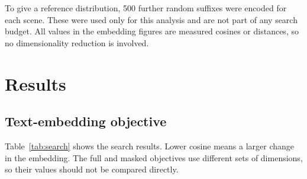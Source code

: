 \documentclass[11pt]{article}
\begin{document}
To give a reference distribution, 500 further random suffixes were encoded for each scene. These were used only for this analysis and are not part of any search budget. All values in the embedding figures are measured cosines or distances, so no dimensionality reduction is involved.

\section{Results}

\subsection{Text-embedding objective}

Table~\ref{tab:search} shows the search results. Lower cosine means a larger change in the embedding. The full and masked objectives use different sets of dimensions, so their values should not be compared directly.
\end{document}
